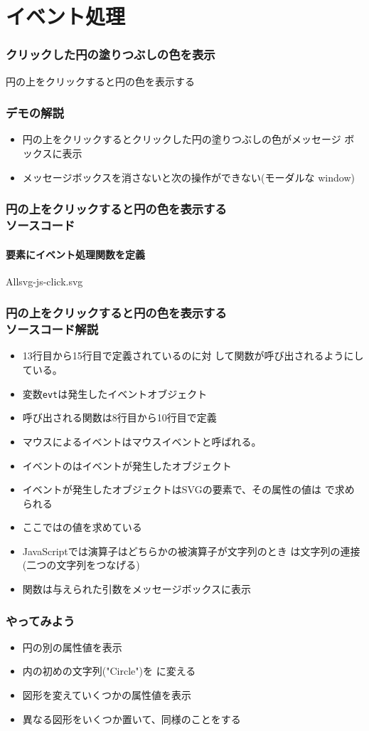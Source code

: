 \section{イベント処理}
\begin{frame}[containsverbatim]
 \frametitle{クリックした円の塗りつぶしの色を表示}
 円の上をクリックすると円の色を表示する
\end{frame}
\begin{frame}[containsverbatim]
 \frametitle{デモの解説}
 \begin{itemize}
  \item 円の上をクリックするとクリックした円の塗りつぶしの色がメッセージ
        ボックスに表示
  \item メッセージボックスを消さないと次の操作ができない(モーダルな
        window)
 \end{itemize}
\end{frame}
\begin{frame}[containsverbatim]
 \frametitle{円の上をクリックすると円の色を表示する\\ソースコード}
 \framesubtitle{要素にイベント処理関数を定義}
 All{svg-js-click.svg}
\end{frame}
\begin{frame}[containsverbatim]
 \frametitle{円の上をクリックすると円の色を表示する\\ソースコード解説}
 \begin{itemize}
  \item 13行目から15行目で定義されているのに対
        して関数が呼び出されるようにしている。
  \item 変数\texttt{evt}は発生したイベントオブジェクト
  \item 呼び出される関数は8行目から10行目で定義
  \item マウスによるイベントはマウスイベントと呼ばれる。
  \item イベントのはイベントが発生したオブジェクト
  \item イベントが発生したオブジェクトはSVGの要素で、その属性の値は
        で求められる
  \item ここではの値を求めている
  \item JavaScriptでは\JSKey{+}演算子はどちらかの被演算子が文字列のとき
        は文字列の連接(二つの文字列をつなげる)
  \item 関数は与えられた引数をメッセージボックスに表示
 \end{itemize}
\end{frame}
\begin{frame}[containsverbatim]
 \frametitle{やってみよう}
\begin{itemize}
  \item 円の別の属性値を表示
  \item {}内の初めの文字列("Circle")を
        に変える
  \item 図形を変えていくつかの属性値を表示
  \item 異なる図形をいくつか置いて、同様のことをする
\end{itemize}
 \end{frame}
